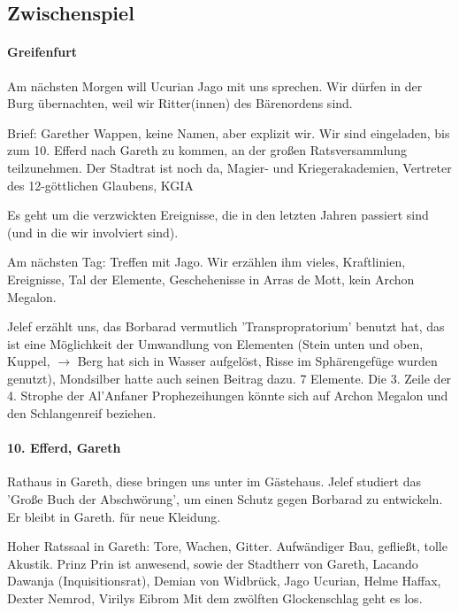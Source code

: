 
\subsection{Zwischenspiel}

\paragraph{Greifenfurt}
Am nächsten Morgen will Ucurian Jago mit uns sprechen. Wir dürfen in der Burg übernachten, weil wir Ritter(innen) des Bärenordens sind.

Brief: Garether Wappen, keine Namen, aber explizit wir. Wir sind eingeladen, bis zum 10. Efferd nach Gareth zu kommen, an der großen Ratsversammlung teilzunehmen. Der Stadtrat ist noch da, Magier- und Kriegerakademien, Vertreter des 12-göttlichen Glaubens, KGIA

Es geht um die verzwickten Ereignisse, die in den letzten Jahren passiert sind (und in die wir involviert sind). 

Am nächsten Tag: Treffen mit Jago. Wir erzählen ihm vieles, Kraftlinien, Ereignisse, Tal der Elemente, Geschehenisse in Arras de Mott, kein Archon Megalon.

Jelef erzählt uns, das Borbarad vermutlich 'Transpropratorium' benutzt hat, das ist eine Möglichkeit der Umwandlung von Elementen (Stein unten und oben, Kuppel, $\to$ Berg hat sich in Wasser aufgelöst, Risse im Sphärengefüge wurden genutzt), Mondsilber hatte auch seinen Beitrag dazu. 7 Elemente. Die 3. Zeile der 4. Strophe der Al'Anfaner Prophezeihungen könnte sich auf Archon Megalon und den Schlangenreif beziehen.

\paragraph{10. Efferd, Gareth} Rathaus in Gareth, diese bringen uns unter im Gästehaus. Jelef studiert das 'Große Buch der Abschwörung', um einen Schutz gegen Borbarad zu entwickeln. Er bleibt in Gareth.  für neue Kleidung. 

Hoher Ratssaal in Gareth: Tore, Wachen, Gitter. Aufwändiger Bau, gefließt, tolle Akustik. Prinz Prin ist anwesend, sowie der Stadtherr von Gareth, Lacando Dawanja (Inquisitionsrat), Demian von Widbrück, Jago Ucurian, Helme Haffax, Dexter Nemrod, Virilys Eibrom 
Mit dem zwölften Glockenschlag geht es los.


